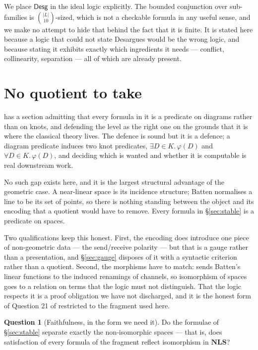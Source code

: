 \documentclass[11pt]{article}
\theoremstyle{plain}
\theoremstyle{definition}
\newtheorem{question}[theorem]{Question}
\newcommand{\Desg}{\mathsf{Desg}}
\begin{document}
We place $\Desg$ in the ideal logic explicitly. The bounded conjunction over sub-families is
$\binom{|L|}{10}$-sized, which is not a checkable formula in any useful sense, and we make no
attempt to hide that behind the fact that it is finite. It is stated here because a logic that
could not state Desargues would be the wrong logic, and because stating it exhibits exactly which
ingredients it needs --- conflict, collinearity, separation --- all of which are already present.

\section{No quotient to take}
\label{sec:noquotient}

\cite[\S5]{Classifier} has a section admitting that every formula in it is a predicate on diagrams
rather than on knots, and defending the level as the right one on the grounds that it is where the
classical theory lives. The defence is sound but it is a defence; a diagram predicate induces two
knot predicates, $\exists D \in K.\,\varphi(D)$ and $\forall D \in K.\,\varphi(D)$, and deciding
which is wanted and whether it is computable is real downstream work.

No such gap exists here, and it is the largest structural advantage of the geometric case. A
near-linear space is its incidence structure; Batten normalises a line to be its set of points, so
there is nothing standing between the object and its encoding that a quotient would have to
remove. Every formula in \S\ref{sec:stable} is a predicate on spaces.

Two qualifications keep this honest. First, the encoding does introduce one piece of non-geometric
data --- the send/receive polarity --- but that is a gauge rather than a presentation, and
\S\ref{sec:gauge} disposes of it with a syntactic criterion rather than a quotient. Second, the
morphisms have to match: \cite[Def.~20]{Geometry} sends Batten's linear functions
\cite[\S1.7]{Batten} to the induced renamings of channels, so isomorphism of spaces goes to a
relation on terms that the logic must not distinguish. That the logic respects it is a
proof obligation we have not discharged, and it is the honest form of Question 21 of
\cite{Geometry} restricted to the fragment used here.

\begin{question}[Faithfulness, in the form we need it]
\label{q:faith}
Do the formulae of \S\ref{sec:stable} separate exactly the non-isomorphic spaces --- that is, does
satisfaction of every formula of the fragment reflect isomorphism in $\mathbf{NLS}$?
\end{question}
\end{document}
